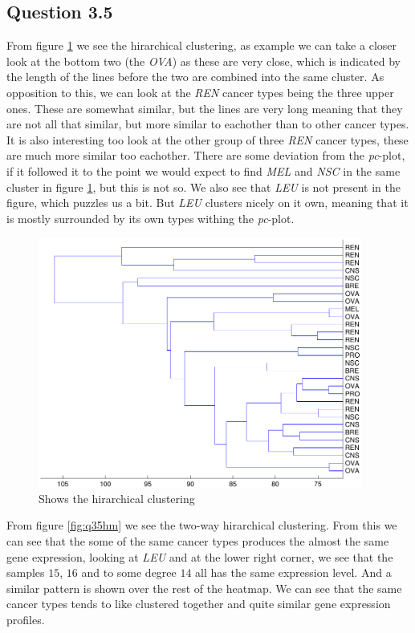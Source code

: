 \subsection*{Question 3.5}

From figure \ref{fig:q35hc} we see the hirarchical clustering, as
example we can take a closer look at the bottom two (the \emph{OVA})
as these are very close, which is indicated by the length of the lines
before the two are combined into the same cluster. As opposition to
this, we can look at the \emph{REN} cancer types being the three upper
ones. These are somewhat similar, but the lines are very long meaning
that they are not all that similar, but more similar to eachother than
to other cancer types. It is also interesting too look at the other
group of three \emph{REN} cancer types, these are much more similar
too eachother. There are some deviation from the \emph{pc}-plot, if it
followed it to the point we would expect to find \emph{MEL} and
\emph{NSC} in the same cluster in figure \ref{fig:q35hc}, but this is
not so. We also see that \emph{LEU} is not present in the figure,
which puzzles us a bit. But \emph{LEU} clusters nicely on it own,
meaning that it is mostly surrounded by its own types withing the
\emph{pc}-plot.

\begin{figure}[!htbp]
  \centering \includegraphics[width=0.95\textwidth]{./images/q35hc}
  \caption{Shows the hirarchical clustering}
  \label{fig:q35hc}
\end{figure}

\newpage

From figure \ref{fig:q35hm} we see the two-way hirarchical
clustering. From this we can see that the some of the same cancer
types produces the almost the same gene expression, looking at
\emph{LEU} and at the lower right corner, we see that the samples
$15$, $16$ and to some degree $14$ all has the same expression
level. And a similar pattern is shown over the rest of the heatmap. We
can see that the same cancer types tends to like clustered together
and quite similar gene expression profiles.

